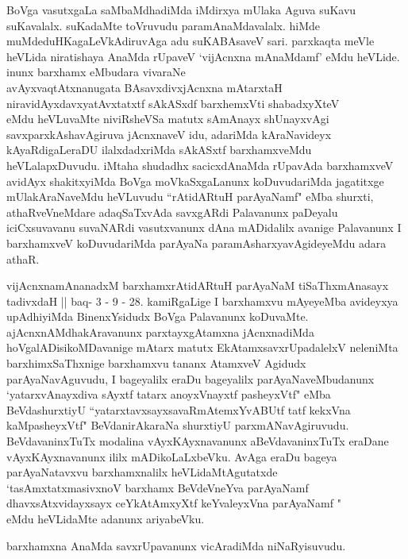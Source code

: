 \begin{artha}
BoVga vasutxgaLa saMbaMdhadiMda iMdirxya mUlaka Aguva suKavu suKavalalx. suKadaMte toVruvudu paramAnaMdavalalx. hiMde muMdeduHKagaLeVkAdiruvAga adu suKABAsaveV sari. parxkaqta meVle heVLida niratishaya AnaMda rUpaveV `vijAcnxna mAnaMdamf' eMdu heVLide. inunx barxhamx eMbudara vivaraNe\\
avAyxvaqtAtxnanugata BAsavxdivxjAcnxna mAtarxtaH\\
niravidAyxdavxyatAvxtatxtf sAkASxdf barxhemxVti shabadxyXteV\\
eMdu heVLuvaMte niviRsheVSa matutx sAmAnayx shUnayxvAgi savxparxkAshavAgiruva jAcnxnaveV idu, adariMda kAraNavideyx kAyaRdigaLeraDU ilalxdadxriMda sAkASxtf barxhamxveMdu heVLalapxDuvudu. iMtaha shudadhx sacicxdAnaMda rUpavAda barxhamxveV avidAyx shakitxyiMda BoVga moVkaSxgaLanunx koDuvudariMda jagatitxge mUlakAraNaveMdu heVLuvudu ``rAtidARtuH parAyaNamf" eMba shurxti, athaRveVneMdare adaqSaTxvAda savxgARdi Palavanunx paDeyalu iciCxsuvavanu suvaNARdi vasutxvanunx dAna mADidalilx avanige Palavanunx I barxhamxveV koDuvudariMda parAyaNa paramAsharxyavAgideyeMdu adara athaR. 
\end{artha}

\begin{artha}
vijAcnxnamAnanadxM barxhamxrAtidARtuH parAyaNaM tiSaThxmAnasayx tadivxdaH || baq- 3 - 9 - 28. kamiRgaLige I barxhamxvu mAyeyeMba avideyxya upAdhiyiMda BinenxYsidudx BoVga Palavanunx koDuvaMte. ajAcnxnAMdhakAravanunx parxtayxgAtamxna jAcnxnadiMda hoVgalADisikoMDavanige mAtarx matutx EkAtamxsavxrUpadalelxV neleniMta barxhimxSaThxnige barxhamxvu tananx AtamxveV Agidudx parAyaNavAguvudu, I bageyalilx eraDu bageyalilx parAyaNaveMbudanunx `yatarxvA\s nayxdiva sAyxtf tatarx anoyxVnayxtf pasheyxVtf" eMba BeVdashurxtiyU ``yatarxtavxsayxsavaRmAtemxYvABUtf tatf kekxVna kaMpasheyxVtf" BeVdanirAkaraNa shurxtiyU parxmANavAgiruvudu. BeVdavaninxTuTx modalina vAyxKAyxnavanunx aBeVdavaninxTuTx eraDane vAyxKAyxnavanunx ililx mADikoLaLxbeVku. AvAga eraDu bageya parAyaNatavxvu barxhamxnalilx heVLidaMtAgutatxde \\`tasAmxtatxmasivxnoV barxhamx BeVdeVneYva parAyaNamf \\dhavxsAtxvidayxsayx ceYkAtAmxyXtf keYvaleyxVna parAyaNamf " \\eMdu heVLidaMte adanunx ariyabeVku.
\end{artha}

\begin{center}
barxhamxna AnaMda savxrUpavanunx vicAradiMda niNaRyisuvudu.
\end{center}

